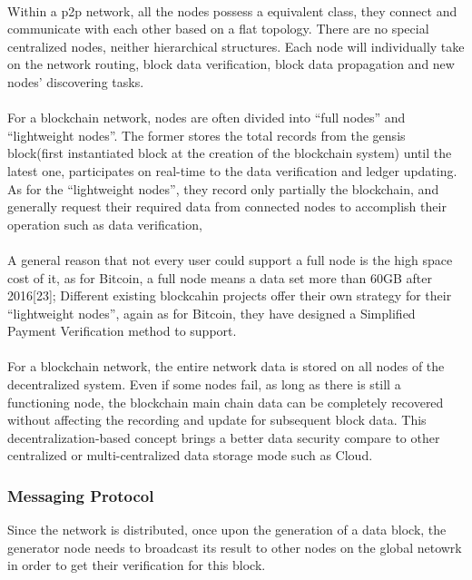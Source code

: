 \documentclass[]{article}
\begin{document}
\begin{CJK*}{UTF8}{gbsn}
\paragraph{} Within a p2p network, all the nodes possess a equivalent class, they connect and communicate with each other based on a flat topology. There are no special centralized nodes, neither hierarchical structures. Each node will individually take on the network routing, block data verification, block data propagation and new nodes' discovering tasks.
\paragraph{} For a blockchain network, nodes are often divided into ``full nodes'' and ``lightweight nodes''. The former stores the total records from the gensis block(first instantiated block at the creation of the blockchain system) until the latest one, participates on real-time to the data verification and ledger updating. As for the ``lightweight nodes'', they record only partially the blockchain, and generally request their required data from connected nodes to accomplish their operation such as data verification, \paragraph{} A general reason that not every user could support a full node is the high space cost of it, as for Bitcoin, a full node means a data set more than 60GB after 2016[23];
Different existing blockcahin projects offer their own strategy for their ``lightweight nodes'', again as for Bitcoin, they have designed a Simplified Payment Verification method to support.
\paragraph{} For a blockchain network, the entire network data is stored on all nodes of the decentralized system. Even if some nodes fail, as long as there is still a functioning node, the blockchain main chain data can be completely recovered without affecting the recording and update for subsequent block data. This decentralization-based concept brings a better data security compare to other centralized or multi-centralized data storage mode such as Cloud.
\subsubsection*{Messaging Protocol}
Since the network is distributed, once upon the generation of a data block, the generator node needs to broadcast its result to other nodes on the global netowrk in order to get their verification for this block.

\end{CJK*}
\end{document}
